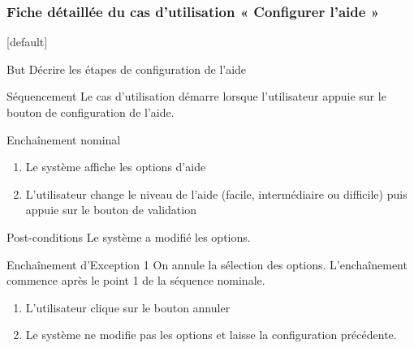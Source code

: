 \documentclass{beamer}
\begin{document}
\begin{frame}
  \frametitle{Fiche détaillée du cas d'utilisation « Configurer l’aide »}
  [default]
  \begin{block}{\footnotesize{But}}
    \scriptsize{Décrire les étapes de configuration de l’aide}
  \end{block}
  \pause
  \begin{block}{\footnotesize{Séquencement}}
    \scriptsize{Le cas d'utilisation démarre lorsque l'utilisateur appuie sur le bouton de configuration de l’aide.}
  \end{block}
  \pause
  \begin{block}{\footnotesize{Enchaînement nominal}}
    \begin{enumerate}    
      [circle]
      \item
        \scriptsize{Le système affiche les options d’aide}
      \item
        \scriptsize{L'utilisateur change le niveau de l’aide (facile, intermédiaire ou difficile) puis appuie sur le bouton de validation}
    \end{enumerate}
  \pause 
  \end{block}
  \begin{block}{\footnotesize{Post-conditions}}
    \scriptsize{Le système a modifié les options.}
  \pause
  \end{block}
  \begin{block}{\footnotesize{Enchaînement d’Exception 1}}
    \scriptsize{On annule la sélection des options. L'enchaînement commence après le point 1 de la séquence nominale.}
    \begin{enumerate}    
      [circle]
      \item
        \scriptsize{L’utilisateur clique sur le bouton annuler}
      \item
        \scriptsize{Le système ne modifie pas les options et laisse la configuration précédente.}
    \end{enumerate}
  \end{block}
\end{frame}
\end{document}
